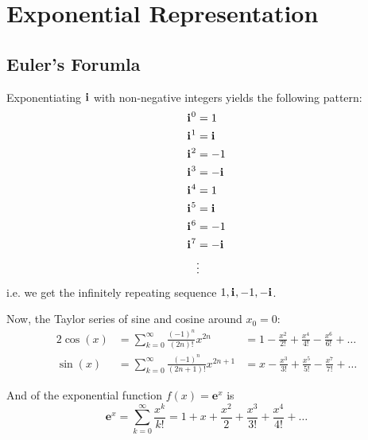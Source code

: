 \documentclass{article}
\newcommand{\iu}{\mathbf{i}\mkern1mu}
\newcommand{\Eu}[1]{\mathbf{e}^{#1}}
\begin{document}
\section{Exponential Representation}
\subsection{Euler's Forumla}
Exponentiating $\iu$ with non-negative integers yields the following pattern:
\begin{align*}
	\iu^0 & = 1    \\
	\iu^1 & = \iu  \\
	\iu^2 & = -1   \\
	\iu^3 & = -\iu \\
	\iu^4 & = 1    \\
	\iu^5 & = \iu  \\
	\iu^6 & = -1   \\
	\iu^7 & = -\iu \\
	      & \vdots
\end{align*}
i.e. we get the infinitely repeating sequence ${1, \iu, -1, -\iu}$.

Now, the Taylor series of sine and cosine around $x_{0}=0$:
\begin{alignat}{2}
	\cos(x) & = \sum\limits_{k=0}^{\infty} \frac{(-1)^{n}}{(2n)!}x^{2n}     & = 1 - \frac{x^2}{2!} + \frac{x^4}{4!} - \frac{x^6}{6!} + \dots \\
	\sin(x) & = \sum\limits_{k=0}^{\infty} \frac{(-1)^{n}}{(2n+1)!}x^{2n+1} & = x-\frac{x^3}{3!}+\frac{x^5}{5!} - \frac{x^7}{7!} + \dots
	\label{eq:cosine_and_sine_taylor}
\end{alignat}

And of the exponential function $f(x)=\Eu{x}$ is
\begin{equation}
	\Eu{x} = \sum\limits_{k=0}^{\infty} \frac{x^{k}}{k!} = 1 + x + \frac{x^2}{2} + \frac{x^3}{3!} + \frac{x^4}{4!} + \dots
	\label{eq:exp_taylor}
\end{equation}
\end{document}
